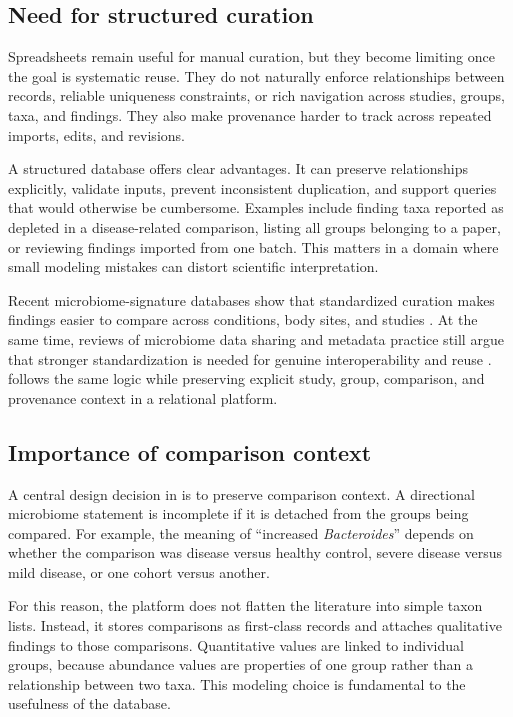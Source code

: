 \subsection{Need for structured curation}

Spreadsheets remain useful for manual curation, but they become limiting once the goal is systematic reuse. They do not naturally enforce relationships between records, reliable uniqueness constraints, or rich navigation across studies, groups, taxa, and findings. They also make provenance harder to track across repeated imports, edits, and revisions.

A structured database offers clear advantages. It can preserve relationships explicitly, validate inputs, prevent inconsistent duplication, and support queries that would otherwise be cumbersome. Examples include finding taxa reported as depleted in a disease-related comparison, listing all groups belonging to a paper, or reviewing findings imported from one batch. This matters in a domain where small modeling mistakes can distort scientific interpretation.

Recent microbiome-signature databases show that standardized curation makes findings easier to compare across conditions, body sites, and studies \citep{geistlinger2024bugsigdb}. At the same time, reviews of microbiome data sharing and metadata practice still argue that stronger standardization is needed for genuine interoperability and reuse \citep{huttenhower2023sharing,zass2024toolkit}. \projectname{} follows the same logic while preserving explicit study, group, comparison, and provenance context in a relational platform.

\subsection{Importance of comparison context}

A central design decision in \projectname{} is to preserve comparison context. A directional microbiome statement is incomplete if it is detached from the groups being compared. For example, the meaning of ``increased \textit{Bacteroides}'' depends on whether the comparison was disease versus healthy control, severe disease versus mild disease, or one cohort versus another.

For this reason, the platform does not flatten the literature into simple taxon lists. Instead, it stores comparisons as first-class records and attaches qualitative findings to those comparisons. Quantitative values are linked to individual groups, because abundance values are properties of one group rather than a relationship between two taxa. This modeling choice is fundamental to the usefulness of the database.

